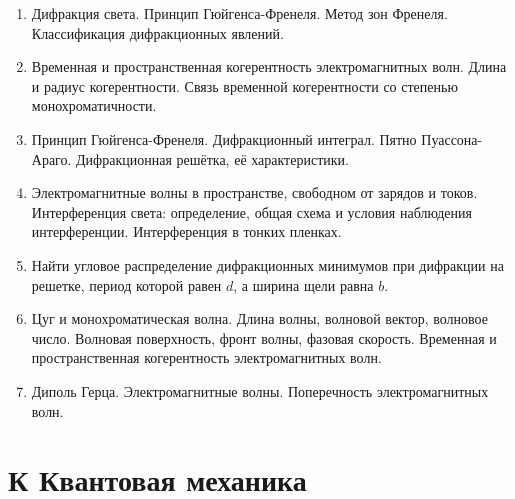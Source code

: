 \documentclass[12pt]{article}
\newcommand{\oL}[1]{\label{О-#1}}
\def\twodigits#1{%
\ifnum#1<10 0\fi 
\number#1}
\begin{document}
\begin{enumerate}[label={\textbf{О-\protect\twodigits{\theenumi}}}]

\item\oL{1}
Дифракция света. Принцип Гюйгенса-Френеля. Метод зон Френеля. Классификация дифракционных явлений.

\item\oL{2}
Временная и пространственная когерентность электромагнитных волн. Длина и радиус когерентности. Связь временной когерентности со степенью монохроматичности.

\item\oL{3}
Принцип Гюйгенса-Френеля. Дифракционный интеграл. Пятно Пуассона-Араго. Дифракционная решётка, её характеристики.

\item\oL{4}
Электромагнитные волны в пространстве, свободном от зарядов и токов. Интерференция света: определение, общая схема и условия наблюдения интерференции. Интерференция в тонких пленках.

\item\oL{5}
Найти угловое распределение дифракционных минимумов при дифракции на решетке, период которой равен $d$, а ширина щели равна $b$.

\item\oL{6}
Цуг и монохроматическая волна. Длина волны, волновой вектор, волновое число. Волновая поверхность, фронт волны, фазовая скорость. Временная и пространственная когерентность электромагнитных волн.

\item\oL{7}
Диполь Герца. Электромагнитные волны. Поперечность электромагнитных волн.

\end{enumerate}

%
\section*{К Квантовая механика}
%
\end{document}
